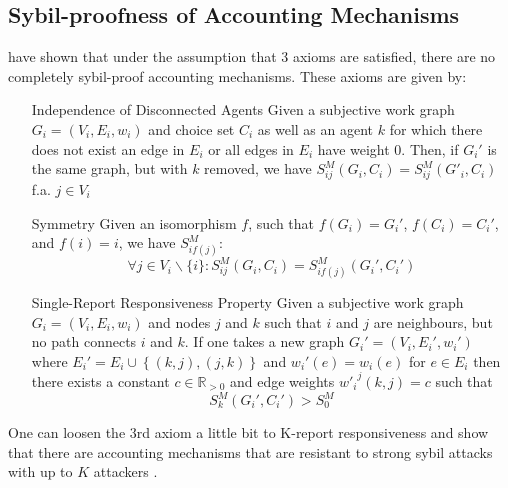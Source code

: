 \documentclass[11pt,a4paper]{report}
\theoremstyle{definition}
\theoremstyle{theorem}
\theoremstyle{proposition}
\theoremstyle{corollary}
\theoremstyle{lemma}
\theoremstyle{example}
\theoremstyle{remark}
\begin{document}
\subsection{Sybil-proofness of Accounting Mechanisms}
\label{subsec:On the Sybil-Proofness of Accounting Mechanisms} 
\cite{On the Sybil-Proofness of Accounting Mechanisms} have shown that under the assumption that 3 axioms are satisfied, there are no completely sybil-proof accounting mechanisms. These axioms are given by:
\begin{itemize}
\item[Independence of Disconnected Agents]Given a subjective work graph $G_i=(V_i,E_i,w_i)$ and choice set $C_i$ as well as an agent $k$ for which there does not exist an edge in $E_i$ or all edges in $E_i$ have weight 0. Then, if $G_i'$ is the same graph, but with $k$ removed, we have $S_{ij}^M(G_i,C_i)=S_{ij}^M(G'_i,C_i)$ f.a. $j\in{}V_i$
\item[Symmetry]Given an isomorphism $f$, such that $f(G_i)=G_i'$, $f(C_i)=C_i'$, and $f(i)=i$, we have $S^M_{if(j)}$:
\begin{equation}
\forall{}j\in{}V_i\backslash{}\{i\}:S_{ij}^M(G_i,C_i)=S_{if(j)}^M(G_i',C_i')
\end{equation}
\item[Single-Report Responsiveness Property]Given a subjective work graph $G_i=(V_i,E_i,w_i)$ and nodes $j$ and $k$ such that $i$ and $j$ are neighbours, but no path connects $i$ and $k$. If one takes a new graph $G_i'=(V_i,E_i',w_i')$ where $E_i'=E_i\cup{}\left\lbrace{}(k,j),(j,k)\right\rbrace$ and $w_i'(e)=w_i(e)$ for $e\in{}E_i$ then there exists a constant $c\in\mathbb{R}_{>0}$ and edge weights ${w'_i}^j(k,j)=c$ such that 
\begin{equation}
S_k^M(G_i',C_i')>S_0^M
\end{equation}
\end{itemize} 
One can loosen the 3rd axiom a little bit to K-report responsiveness and show that there are accounting mechanisms that are resistant to strong sybil attacks with up to $K$ attackers \cite{On the Sybil-Proofness of Accounting Mechanisms}.
\end{document}
